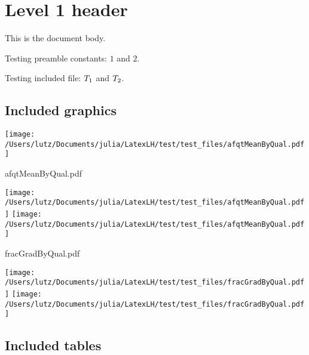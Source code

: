 \documentclass[english]{article}
\newcommand{\testOne}{1}
\newcommand{\testTwo}{2}
\begin{document}
\section{Level 1 header}

This is the document body.

Testing preamble constants: $\testOne$ and $\testTwo$.

Testing included file: $T_1$ and $T_2$.

\subsection{Included graphics}

\texttt{[image: /Users/lutz/Documents/julia/LatexLH/test/test\_files/afqtMeanByQual.pdf]}

afqtMeanByQual.pdf

\texttt{[image: /Users/lutz/Documents/julia/LatexLH/test/test\_files/afqtMeanByQual.pdf]} \texttt{[image: /Users/lutz/Documents/julia/LatexLH/test/test\_files/afqtMeanByQual.pdf]}

fracGradByQual.pdf

\texttt{[image: /Users/lutz/Documents/julia/LatexLH/test/test\_files/fracGradByQual.pdf]} \texttt{[image: /Users/lutz/Documents/julia/LatexLH/test/test\_files/fracGradByQual.pdf]}

\subsection{Included tables}


\end{document}
